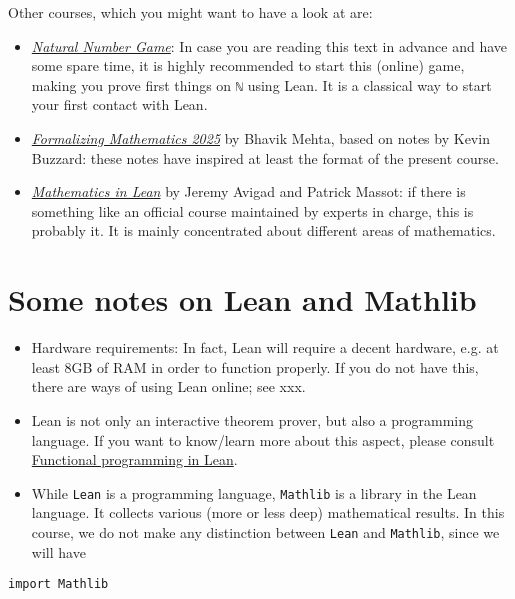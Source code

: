 \documentclass{memoir}
\begin{document}
Other courses, which you might want to have a look at are:

\begin{itemize}
\item \hyperlink{"https://adam.math.hhu.de/#/g/leanprover-community/nng4"}{\emph{Natural Number Game}}: In case you are reading this text in advance and have some spare time, it is highly recommended to start this (online) game, making you prove first things on \Verb|ℕ| using Lean. It is a classical way to start your first contact with Lean.\item \hyperlink{"https://b-mehta.github.io/formalising-mathematics-notes/"}{\emph{Formalizing Mathematics 2025}} by Bhavik Mehta, based on notes by Kevin Buzzard: these notes have inspired at least the format of the present course.\item \hyperlink{"https://leanprover-community.github.io/mathematics_in_lean/"}{\emph{Mathematics in Lean}} by Jeremy Avigad and Patrick Massot: if there is something like an official course maintained by experts in charge, this is probably it. It is mainly concentrated about different areas of mathematics.
\end{itemize}




\section{Some notes on Lean and Mathlib}

\begin{itemize}
\item Hardware requirements: In fact, Lean will require a decent hardware, e.g. at least 8GB of RAM in order to function properly. If you do not have this, there are ways of using Lean online; see xxx.\item Lean is not only an interactive theorem prover, but also a programming language. If you want to know/learn more about this aspect, please consult \hyperlink{"https://lean-lang.org/functional_programming_in_lean/"}{Functional programming in Lean}.\item While \Verb|Lean| is a programming language, \Verb|Mathlib| is a library in the Lean language. It collects various (more or less deep) mathematical results. In this course, we do not make any distinction between \Verb|Lean| and \Verb|Mathlib|, since we will have
\end{itemize}


\begin{verbatim}
import Mathlib

\end{verbatim}
\end{document}
